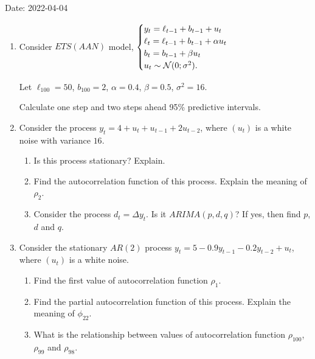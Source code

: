 Date: 2022-04-04



\begin{enumerate}

\item Consider $ETS(AAN)$ model,
	$
	\begin{cases}
	y_t = \ell_{t-1} + b_{t-1} + u_t \\
	\ell_t = \ell_{t-1} + b_{t-1} + \alpha u_t \\
	b_t = b_{t-1} + \beta u_t \\
	u_t \sim \mathcal{N}(0;\sigma^2). \\
	\end{cases}
	$
		
Let $\ell_{100} = 50$, $b_{100} = 2$, $\alpha=0.4$, $\beta=0.5$, $\sigma^2 = 16$.

Calculate one step and two steps ahead 95\% predictive intervals. 

\item Consider the process $y_t = 4 + u_t + u_{t-1} + 2 u_{t-2}$, where $(u_t)$ is a white noise with variance $16$.

\begin{enumerate}
	\item Is this process stationary? Explain. 
	\item Find the autocorrelation function of this process. Explain the meaning of $\rho_2$.
	\item Consider the process $d_t = \Delta y_t$. Is it $ARIMA(p, d, q)$? If yes, then find $p$, $d$ and $q$.
\end{enumerate}

\item Consider the stationary $AR(2)$ process $y_t = 5 - 0.9y_{t-1} - 0.2y_{t-2} + u_t$, where $(u_t)$ is a white noise. 
\begin{enumerate}
	\item Find the first value of autocorrelation function $\rho_1$.
	\item Find the partial autocorrelation function of this process. Explain the meaning of $\phi_{22}$.
	\item What is the relationship between values of autocorrelation function $\rho_{100}$, $\rho_{99}$ and $\rho_{98}$.
\end{enumerate}


\end{enumerate}
